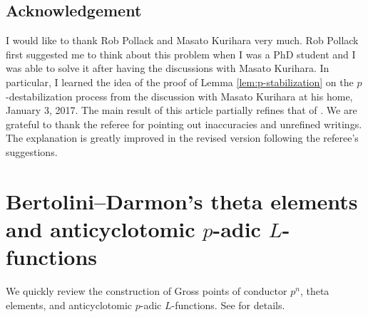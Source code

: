 \documentclass[11pt]{amsart}
\numberwithin{equation}{section}
\theoremstyle{definition}
\begin{document}
\subsection*{Acknowledgement}
I would like to thank Rob Pollack and Masato Kurihara very much.
Rob Pollack first suggested me to think about this problem when I was a PhD student and I was able to solve it after having the discussions with Masato Kurihara.
In particular, I learned the idea of the 
proof of Lemma \ref{lem:p-stabilization} on the $p$-destabilization process from the discussion with Masato Kurihara at his home, January 3, 2017.
The main result of this article partially refines that of \cite{kim-mazur-tate}.
We are grateful to thank the referee for pointing out inaccuracies and unrefined writings.
The explanation is greatly improved in the revised version following the referee's suggestions.

\section{Bertolini--Darmon's theta elements and anticyclotomic $p$-adic $L$-functions} \label{sec:bertolini-darmon-elements}
We quickly review the construction of Gross points of conductor $p^n$, theta elements, and anticyclotomic $p$-adic $L$-functions. 
See  \cite{chida-hsieh-main-conj, chida-hsieh-p-adic-L-functions, kim-overconvergent} for details.
\end{document}
